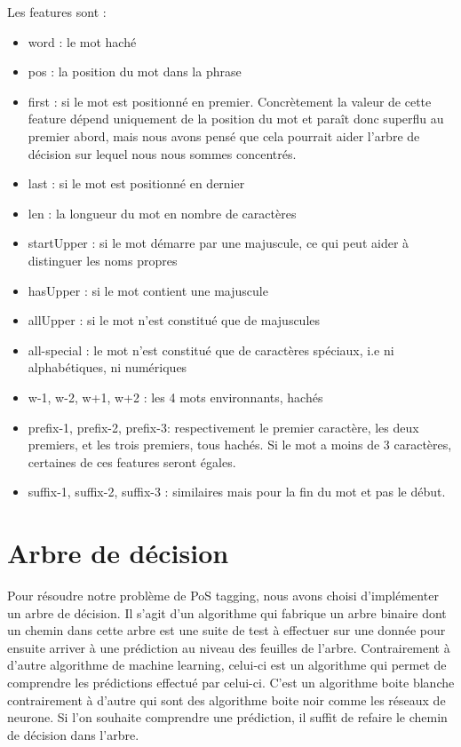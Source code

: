 \documentclass[french, 14pt]{memoir}
\begin{document}
Les features sont :
\begin{itemize}
	\item word : le mot haché
	\item pos : la position du mot dans la phrase
	\item first : si le mot est positionné en premier. Concrètement la valeur de cette feature dépend uniquement de la position du mot et paraît donc superflu au premier abord, mais nous avons pensé que cela pourrait aider l'arbre de décision sur lequel nous nous sommes concentrés.
	\item last : si le mot est positionné en dernier
	\item len : la longueur du mot en nombre de caractères
	\item startUpper : si le mot démarre par une majuscule, ce qui peut aider à distinguer les noms propres
	\item hasUpper : si le mot contient une majuscule
	\item allUpper : si le mot n'est constitué que de majuscules
	\item all-special : le mot n'est constitué que de caractères spéciaux, i.e ni alphabétiques, ni numériques
	\item w-1, w-2, w+1, w+2 : les 4 mots environnants, hachés
	\item prefix-1, prefix-2, prefix-3: respectivement le premier caractère, les deux premiers, et les trois premiers, tous hachés. Si le mot a moins de 3 caractères, certaines de ces features seront égales.
	\item suffix-1, suffix-2, suffix-3 : similaires mais pour la fin du mot et pas le début.
\end{itemize}


\section{Arbre de décision}

Pour résoudre notre problème de PoS tagging, nous avons choisi d'implémenter un arbre de décision. Il s'agit d'un algorithme qui fabrique un arbre binaire dont un chemin dans cette arbre est une suite de test à effectuer sur une donnée pour ensuite arriver à une prédiction au niveau des feuilles de l'arbre. Contrairement à d'autre algorithme de machine learning, celui-ci est un algorithme qui permet de comprendre les prédictions effectué par celui-ci. C'est un algorithme boite blanche contrairement à d'autre qui sont des algorithme boite noir comme les réseaux de neurone. 
Si l'on souhaite comprendre une prédiction, il suffit de refaire le chemin de décision dans l'arbre. 
\end{document}
